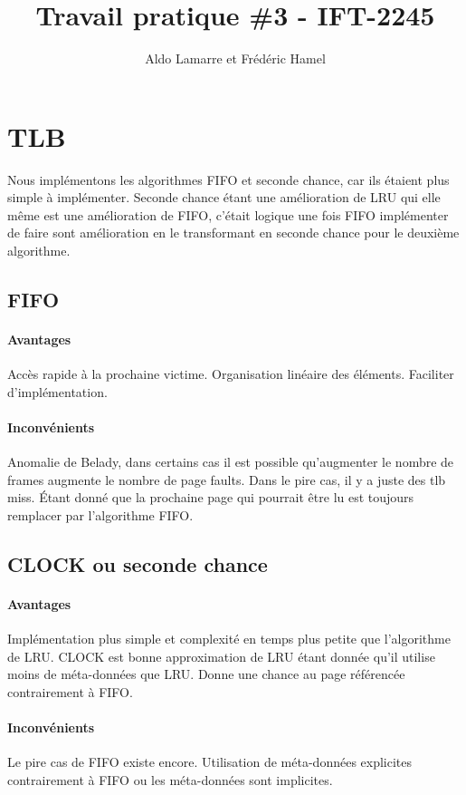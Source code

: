 \documentclass{article}
\title{Travail pratique \#3 - IFT-2245}
\author{Aldo Lamarre et Frédéric Hamel }
\begin{document}
\maketitle


\section*{TLB}
Nous implémentons les algorithmes FIFO et seconde chance, car ils étaient plus 
simple à implémenter. Seconde chance étant une amélioration de LRU qui elle 
même est une amélioration de FIFO, c'était logique une fois FIFO implémenter 
de faire sont amélioration en le transformant en seconde chance pour le 
deuxième algorithme.

\subsection{FIFO}
\paragraph{Avantages}
Accès rapide à la prochaine victime.
Organisation linéaire des éléments.
Faciliter d'implémentation. 

\paragraph{Inconvénients}
Anomalie de Belady, dans certains cas il est possible qu'augmenter le nombre de frames 
augmente le nombre de page faults. Dans le pire cas, il y a juste des tlb miss.
Étant donné que la prochaine page qui pourrait être lu est toujours remplacer 
par l'algorithme FIFO. 

\subsection{CLOCK ou seconde chance}
\paragraph{Avantages}
Implémentation plus simple et complexité en temps plus petite que l'algorithme de LRU.
CLOCK est bonne approximation de LRU étant donnée qu'il utilise moins de méta-données que LRU.
Donne une chance au page référencée contrairement à FIFO.

\paragraph{Inconvénients}
Le pire cas de FIFO existe encore. Utilisation de méta-données explicites contrairement
à FIFO ou les méta-données sont implicites. 
\end{document}
